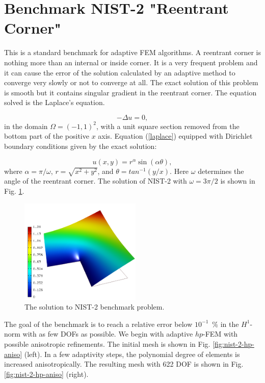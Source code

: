 \section{Benchmark NIST-2 "Reentrant Corner"}
\label{sec:bench-2}

This is a standard benchmark for adaptive FEM algorithms.
A reentrant corner is nothing more than an internal or inside corner.
It is a very frequent problem and it can cause the error of the solution 
calculated by an adaptive method to converge very slowly or not to converge at all.
The exact solution of this problem is smooth but it contains
singular gradient in the reentrant corner.
The equation solved is the Laplace's equation.

\begin{equation} \label{laplace}
-\Delta u = 0,
\end{equation}
in the domain $\Omega = (-1, 1)^2$, with a unit square
section removed from the bottom part of the positive $x$ axis.
Equation (\ref{laplace}) equipped with Dirichlet
boundary conditions given by the exact solution:

\begin{equation}\label{exact-nist-2}
u(x, y) = r^{\alpha}\sin(\alpha \theta),
\end{equation}
where $\alpha = \pi / \omega$, $r = \sqrt{x^2+y^2}$,
and $\theta = tan^{-1}(y/x)$. Here $\omega $ determines
the angle of the reentrant corner.
The solution of NIST-2 with $\omega = 3 \pi / 2$
is shown in Fig. \ref{fig:sln-nist02}.

\begin{figure}[!ht]
\centering
\includegraphics[height=5cm]{nist/nist-2/solution.png}
\caption{The solution to NIST-2 benchmark problem.}
\label{fig:sln-nist02}
\end{figure}
\noindent

The goal of the benchmark is to reach a relative error below
$10^{-1}$~\% in the $H^1$-norm with as few DOFs as possible.
We begin with adaptive $hp$-FEM with possible anisotropic refinements.
The initial mesh is shown in Fig. \ref{fig:nist-2-hp-aniso} (left).
In a few adaptivity steps, the polynomial degree of elements is increased
anisotropically.
The resulting mesh with 622 DOF is shown in Fig. \ref{fig:nist-2-hp-aniso} (right).

